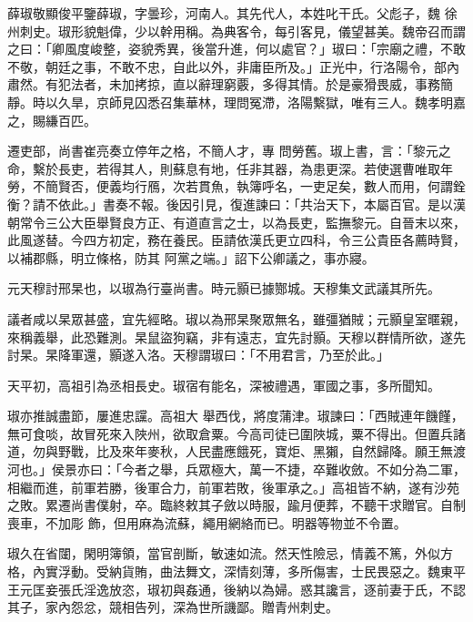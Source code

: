
\begin{pinyinscope}

 薛琡敬顯俊平鑒薛琡，字曇珍，河南人。其先代人，本姓叱干氏。父彪子，魏
 徐州刺史。琡形貌魁偉，少以幹用稱。為典客令，每引客見，儀望甚美。魏帝召而謂之曰：「卿風度峻整，姿貌秀異，後當升進，何以處官？」琡曰：「宗廟之禮，不敢不敬，朝廷之事，不敢不忠，自此以外，非庸臣所及。」正光中，行洛陽令，部內肅然。有犯法者，未加拷掠，直以辭理窮覈，多得其情。於是豪猾畏威，事務簡靜。時以久旱，京師見囚悉召集華林，理問冤滯，洛陽繫獄，唯有三人。魏孝明嘉之，賜縑百匹。



 遷吏部，尚書崔亮奏立停年之格，不簡人才，專
 問勞舊。琡上書，言：「黎元之命，繫於長吏，若得其人，則蘇息有地，任非其器，為患更深。若使選曹唯取年勞，不簡賢否，便義均行鴈，次若貫魚，執簿呼名，一吏足矣，數人而用，何謂銓衡？請不依此。」書奏不報。後因引見，復進諫曰：「共治天下，本屬百官。是以漢朝常令三公大臣舉賢良方正、有道直言之士，以為長吏，監撫黎元。自晉末以來，此風遂替。今四方初定，務在養民。臣請依漢氏更立四科，令三公貴臣各薦時賢，以補郡縣，明立條格，防其
 阿黨之端。」詔下公卿議之，事亦寢。



 元天穆討邢杲也，以琡為行臺尚書。時元顥已據酂城。天穆集文武議其所先。



 議者咸以杲眾甚盛，宜先經略。琡以為邢杲聚眾無名，雖彊猶賊；元顥皇室暱親，來稱義舉，此恐難測。杲鼠盜狗竊，非有遠志，宜先討顥。天穆以群情所欲，遂先討杲。杲降軍還，顥遂入洛。天穆謂琡曰：「不用君言，乃至於此。」



 天平初，高祖引為丞相長史。琡宿有能名，深被禮遇，軍國之事，多所聞知。



 琡亦推誠盡節，屢進忠讜。高祖大
 舉西伐，將度蒲津。琡諫曰：「西賊連年饑饉，無可食啖，故冒死來入陜州，欲取倉粟。今高司徒已圍陜城，粟不得出。但置兵諸道，勿與野戰，比及來年麥秋，人民盡應餓死，寶炬、黑獺，自然歸降。願王無渡河也。」侯景亦曰：「今者之舉，兵眾極大，萬一不捷，卒難收斂。不如分為二軍，相繼而進，前軍若勝，後軍合力，前軍若敗，後軍承之。」高祖皆不納，遂有沙苑之敗。累遷尚書僕射，卒。臨終敕其子斂以時服，踰月便葬，不聽干求贈官。自制喪車，不加彫
 飾，但用麻為流蘇，繩用網絡而已。明器等物並不令置。



 琡久在省闥，閑明簿領，當官剖斷，敏速如流。然天性險忌，情義不篤，外似方格，內實浮動。受納貨賄，曲法舞文，深情刻薄，多所傷害，士民畏惡之。魏東平王元匡妾張氏淫逸放恣，琡初與姦通，後納以為婦。惑其讒言，逐前妻于氏，不認其子，家內怨忿，競相告列，深為世所譏鄙。贈青州刺史。




\end{pinyinscope}
